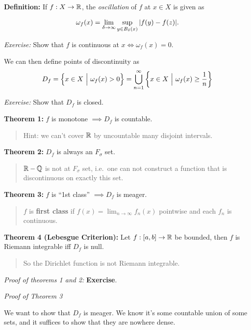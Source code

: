 \textbf{Definition:} If \(f: X \to {\mathbb{R}}\), the \emph{oscillation} of
\(f\) at \(x \in X\) is given as

\begin{align*}
\omega_{f}(x) = \lim_{\delta \to \infty} \sup_{y \in B_{\delta}(x)} {\left\lvert {f(y) - f(z)} \right\rvert}
.\end{align*}

\emph{Exercise:} Show that \(f\) is continuous at
\(x \iff \omega_f(x) = 0\).

We can then define points of discontinuity as
\begin{align*}
D_f = \left\{{x \in X {~\mathrel{\Big|}~} \omega_f(x) > 0}\right\} = \bigcup_{n=1}^\infty\left\{{x\in X {~\mathrel{\Big|}~} \omega_f(x) \geq \frac 1 n}\right\}
\end{align*}

\emph{Exercise:} Show that \(D_f\) is closed.

\textbf{Theorem 1:} \(f\) is monotone \(\implies D_f\) is countable.

\begin{quote}
Hint: we can't cover \({\mathbb{R}}\) by uncountable many disjoint intervals.
\end{quote}

\textbf{Theorem 2:} \(D_f\) is always an \(F_\sigma\) set.

\begin{quote}
\({\mathbb{R}} - {\mathbb{Q}}\) is not at \(F_\sigma\) set, i.e.~one can not construct a
function that is discontinuous on exactly this set.
\end{quote}

\textbf{Theorem 3:} \(f\) is ``1st class'' \(\implies D_f\) is meager.

\begin{quote}
\(f\) is \textbf{first class} if \(f(x) = \lim_{n\to\infty} f_n(x)\)
pointwise and each \(f_n\) is continuous.
\end{quote}

\textbf{Theorem 4 (Lebesgue Criterion):} Let \(f: [a, b] \to {\mathbb{R}}\) be
bounded, then \(f\) is Riemann integrable iff \(D_f\) is null.

\begin{quote}
So the Dirichlet function is not Riemann integrable.
\end{quote}

\emph{Proof of theorems 1 and 2:} \textbf{Exercise}.

\emph{Proof of Theorem 3}

We want to show that \(D_f\) is meager. We know it's some countable
union of some sets, and it suffices to show that they are nowhere dense.

